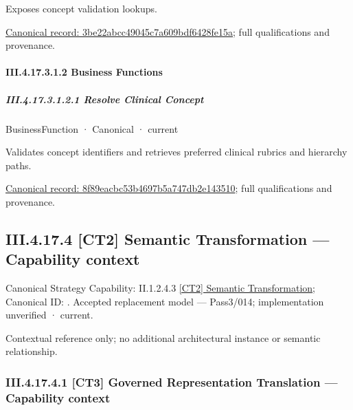 Exposes concept validation lookups.


{\footnotesize \href{../../../../../../../continuum/business/business-service/3be22abcc49045c7a609bdf6428fe15a.md}{Canonical record: 3be22abcc49045c7a609bdf6428fe15a}; full qualifications and provenance.}\par
\paragraph*{III.4.17.3.1.2 Business Functions}
\label{navigation:III.4.17.3.1.2}

\subparagraph*{III.4.17.3.1.2.1 Resolve Clinical Concept}
\label{navigation:III.4.17.3.1.2.1}

\label{element:8f89eacbc53b4697b5a747db2e143510}
{\small BusinessFunction · Canonical · current}\par

Validates concept identifiers and retrieves preferred clinical rubrics and hierarchy paths.


{\footnotesize \href{../../../../../../../continuum/business/business-function/8f89eacbc53b4697b5a747db2e143510.md}{Canonical record: 8f89eacbc53b4697b5a747db2e143510}; full qualifications and provenance.}\par
\subsection*{III.4.17.4 [CT2] Semantic Transformation — Capability context}
\label{navigation:III.4.17.4}

{\small Canonical Strategy Capability: II.1.2.4.3 \hyperref[element:75c038039b55453184cbf1e787120136]{[CT2] Semantic Transformation}; Canonical ID: \texttt{}. Accepted replacement model — Pass3/014; implementation unverified · current.}\par
Contextual reference only; no additional architectural instance or semantic relationship.\par
\subsubsection*{III.4.17.4.1 [CT3] Governed Representation Translation — Capability context}
\label{navigation:III.4.17.4.1}

